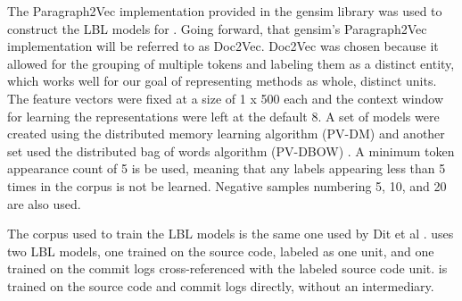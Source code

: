 \label{subsec:method_lm}

The Paragraph2Vec \cite{le2014distributed} implementation provided in the 
gensim library \cite{rehureklrec} was used to construct the LBL models for
\textit{\projname}. Going forward, that gensim's Paragraph2Vec implementation 
will be referred to as Doc2Vec. Doc2Vec was chosen because it allowed for the 
grouping of multiple tokens and labeling them as a distinct entity, which 
works well for our goal of representing methods as whole, distinct units. The
feature vectors were fixed at a size of 1 x 500 each and the context window 
for learning the
representations were left at the default 8. A set of models were created using
the distributed memory learning algorithm (PV-DM) and another set used the 
distributed bag of words algorithm (PV-DBOW) \cite{le2014distributed}. A
minimum token appearance count of 5 is be used, meaning that any labels
appearing less than 5 times in the corpus is not be learned. Negative samples
numbering 5, 10, and 20 are also used.

The corpus used to train the LBL models is the same one used by Dit et al 
\cite{dit2013integrating}. \textit{\projnameA} uses two LBL models, one trained
on the source code, labeled as one unit, and one trained on the commit logs
cross-referenced with the labeled source code unit. \textit{\projnameB} is
trained on the source code and commit logs directly, without an intermediary.